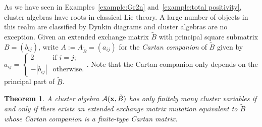 \documentclass{amsart}
\newtheorem{theorem}{Theorem}[section]
\theoremstyle{definition}
\theoremstyle{remark}
\numberwithin{equation}{section}
\newcommand{\cA}{{\mathcal{A}}}
\newcommand{\x}{{\bf x}}
\begin{document}
  As we have seen in Examples~\ref{example:Gr2n} and~\ref{example:total positivity}, cluster algebras have roots in classical Lie theory.  A large number of objects in this realm are classified by Dynkin diagrams and cluster algebras are no exception.  Given an extended exchange matrix $\tilde B$ with principal square submatrix $B=(b_{ij})$, write $A:=A_{\tilde B}=(a_{ij})$ for the \emph{Cartan companion} of $\tilde B$ given by $a_{ij}=\begin{cases}2 & \text{if $i=j$;}\\ -|b_{ij}| & \text{otherwise.}\end{cases}$.  Note that the Cartan companion only depends on the principal part of $\tilde B$.
  \begin{theorem}
    A cluster algebra $\cA(\x,\tilde B)$ has only finitely many cluster variables if and only if there exists an extended exchange matrix mutation equivalent to $\tilde B$ whose Cartan companion is a finite-type Cartan matrix.
  \end{theorem}
\end{document}
